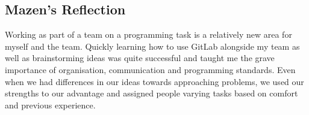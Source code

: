 \documentclass{article}
\begin{document}
\subsection{Mazen's Reflection}
Working as part of a team on a programming task is a relatively new area for myself and the team. Quickly learning how to use GitLab alongside my team as well as brainstorming ideas was quite successful and taught me the grave importance of organisation, communication and programming standards. Even when we had differences in our ideas towards approaching problems, we used our strengths to our advantage and assigned people varying tasks based on comfort and previous experience.
\end{document}
